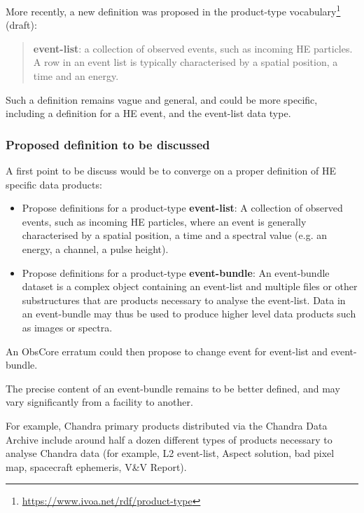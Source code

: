 \documentclass[11pt,a4paper]{ivoa}
\begin{document}
{More recently, a new definition was proposed in the product-type vocabulary\footnote{\url{https://www.ivoa.net/rdf/product-type}} (draft):
\begin{quote}
    \textbf{event-list}: a collection of observed events, such as incoming \gls{HE} particles. A row in an event
    list is typically characterised by a spatial position, a time and an energy.
\end{quote}

Such a definition remains vague and general, and could be more specific, including a definition for a \gls{HE} event, and the
event-list data type.

\subsubsection{Proposed definition to be discussed}

A first point to be discuss would be to converge on a proper definition of \gls{HE} specific data products:
\begin{itemize}
    \item Propose definitions for a product-type \textbf{event-list}: A collection of observed events, such as incoming
    \gls{HE} particles, where an event is generally characterised by a spatial position, a time and a spectral value
    (e.g. an energy, a channel, a pulse height).
    \item Propose definitions for a product-type \textbf{event-bundle}: An event-bundle dataset is a complex object
    containing an event-list and multiple files or other substructures that are products necessary to analyse the
    event-list. Data in an event-bundle may thus be used to produce higher level data products such as images or spectra.
\end{itemize}

An ObsCore erratum could then propose to change event for event-list and event-bundle.

The precise content of an event-bundle remains to be better defined, and may vary significantly from a facility to another.

For example, Chandra primary products distributed via the Chandra Data Archive include around half a dozen different
types of products necessary to analyse Chandra data (for example, L2 event-list, Aspect solution,
bad pixel map, spacecraft ephemeris, V\&V Report).


}
\end{document}
